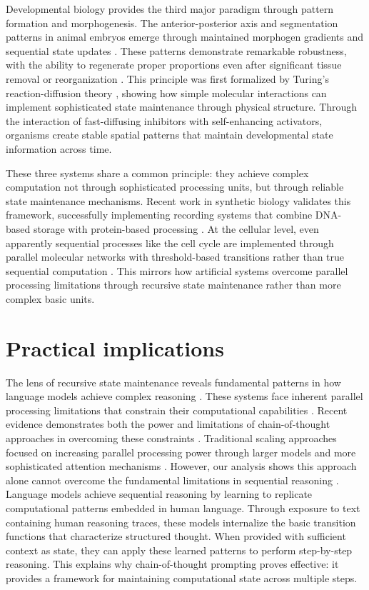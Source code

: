 \documentclass[12pt]{article}
\begin{document}
Developmental biology provides the third major paradigm through pattern formation and morphogenesis.
The anterior-posterior axis and segmentation patterns in animal embryos emerge through maintained morphogen gradients and sequential state updates \cite{pastor2020computation}.
These patterns demonstrate remarkable robustness, with the ability to regenerate proper proportions even after significant tissue removal or reorganization \cite{lobo2012towards}.
This principle was first formalized by Turing's reaction-diffusion theory \cite{turing1952chemical}, showing how simple molecular interactions can implement sophisticated state maintenance through physical structure.
Through the interaction of fast-diffusing inhibitors with self-enhancing activators, organisms create stable spatial patterns that maintain developmental state information across time.

These three systems share a common principle: they achieve complex computation not through sophisticated processing units, but through reliable state maintenance mechanisms.
Recent work in synthetic biology validates this framework, successfully implementing recording systems that combine DNA-based storage with protein-based processing \cite{sheth2017multiplex}.
At the cellular level, even apparently sequential processes like the cell cycle are implemented through parallel molecular networks with threshold-based transitions rather than true sequential computation \cite{alberts2022molecular}.
This mirrors how artificial systems overcome parallel processing limitations through recursive state maintenance rather than more complex basic units.

\section{Practical implications}

The lens of recursive state maintenance reveals fundamental patterns in how language models achieve complex reasoning \cite{dickson2024trust,ahn2024recursive,openai2024o1}.
These systems face inherent parallel processing limitations that constrain their computational capabilities \cite{merrill2023parallelism}.
Recent evidence demonstrates both the power and limitations of chain-of-thought approaches in overcoming these constraints \cite{liu2024mind}.
Traditional scaling approaches focused on increasing parallel processing power through larger models and more sophisticated attention mechanisms \cite{shallue2019measuring}.
However, our analysis shows this approach alone cannot overcome the fundamental limitations in sequential reasoning \cite{peng2024limitations}.
Language models achieve sequential reasoning by learning to replicate computational patterns embedded in human language.
Through exposure to text containing human reasoning traces, these models internalize the basic transition functions that characterize structured thought.
When provided with sufficient context as state, they can apply these learned patterns to perform step-by-step reasoning.
This explains why chain-of-thought prompting proves effective: it provides a framework for maintaining computational state across multiple steps.
\end{document}

